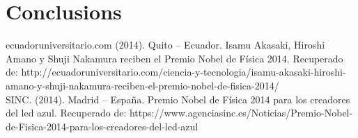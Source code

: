 \documentclass{article}
\begin{document}
\section{Conclusions}
ecuadoruniversitario.com  (2014). Quito – Ecuador. Isamu Akasaki, Hiroshi Amano y Shuji Nakamura reciben el Premio Nobel de Física 2014.  Recuperado de: http://ecuadoruniversitario.com/ciencia-y-tecnologia/isamu-akasaki-hiroshi-amano-y-shuji-nakamura-reciben-el-premio-nobel-de-fisica-2014/\\

SINC. (2014). Madrid – España. Premio Nobel de Física 2014 para los creadores del led azul. Recuperado de: https://www.agenciasinc.es/Noticias/Premio-Nobel-de-Fisica-2014-para-los-creadores-del-led-azul 
\end{document}
